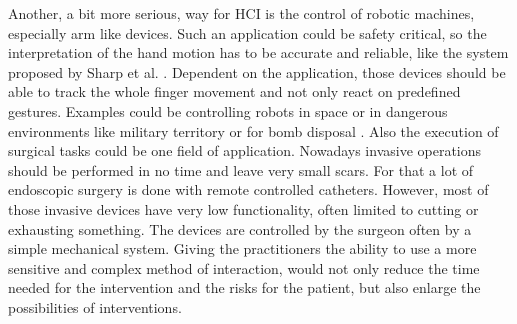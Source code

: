 Another, a bit more serious, way for \ac{HCI} is the control of robotic machines, especially arm like devices. Such an application could be safety critical, so the interpretation of the hand motion has to be accurate and reliable, like the system proposed by Sharp et al. \cite{sharp2015accurate}. Dependent on the application, those devices should be able to track the whole finger movement and not only react on predefined gestures. Examples could be controlling robots in space \cite{dipietro2008survey} or in dangerous environments like military territory or for bomb disposal \cite{greenleaf1996developing}. Also the execution of surgical tasks could be one field of application. Nowadays invasive operations should be performed in no time and leave very small scars. For that a lot of endoscopic surgery is done with remote controlled catheters. However, most of those invasive devices have very low functionality, often limited to cutting or exhausting something. The devices are controlled by the surgeon often by a simple mechanical system. Giving the practitioners the ability to use a more sensitive and complex method of interaction, would not only reduce the time needed for the intervention and the risks for the patient, but also enlarge the possibilities of interventions.

